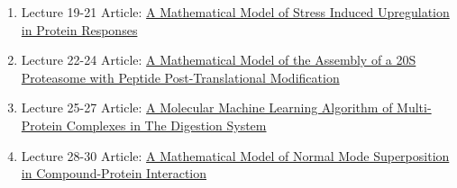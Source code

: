 \documentclass{TMLSStyleGuideResumeVitae}
\begin{document}
\begin{enumerate}
\item Lecture 19-21 Article: \href{}{A Mathematical Model of Stress Induced Upregulation in Protein Responses}
\item Lecture 22-24 Article: \href{}{A Mathematical Model of the Assembly of a 
20S Proteasome with Peptide Post-Translational Modification}
\item Lecture 25-27 Article: \href{}{A Molecular Machine Learning Algorithm of 
Multi-Protein Complexes in The Digestion System}
\item Lecture 28-30 Article: \href{}{A Mathematical Model of Normal Mode 
Superposition in Compound-Protein Interaction}
\end{enumerate}
\end{document}
